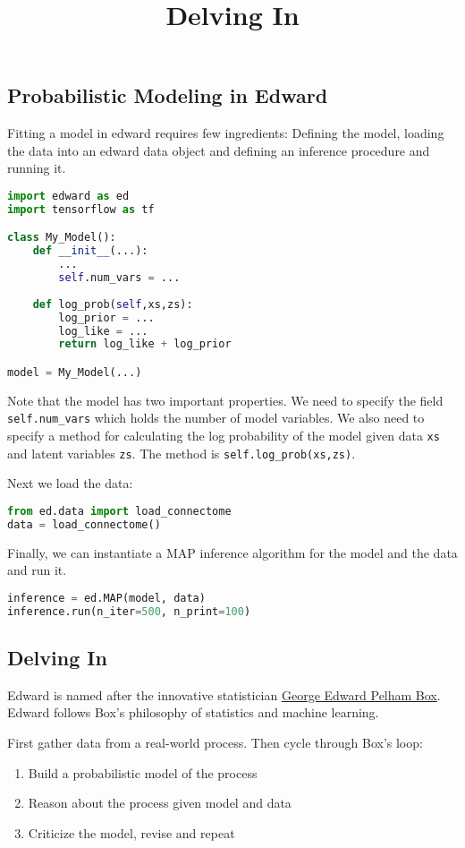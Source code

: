 \title{Delving In}

\subsection{Probabilistic Modeling in Edward}
Fitting a model in edward requires few ingredients: Defining the model, loading the data into an edward data object and defining an inference procedure and running it.

\begin{lstlisting}[language=Python]
import edward as ed
import tensorflow as tf

class My_Model():
    def __init__(...):
        ...
        self.num_vars = ...
 
    def log_prob(self,xs,zs):
        log_prior = ...
        log_like = ...
        return log_like + log_prior

model = My_Model(...)
\end{lstlisting}
Note that the model has two important properties. We need to specify the field \texttt{self.num\_vars} which holds the number of model variables. We also need to specify a method for calculating the log probability of the model given data \texttt{xs} and latent variables \texttt{zs}. The method is \texttt{self.log_prob(xs,zs)}.

Next we load the data:
\begin{lstlisting}[language=Python]
from ed.data import load_connectome
data = load_connectome()
\end{lstlisting}

Finally, we can instantiate a MAP inference algorithm for the model and the data and run it.
\begin{lstlisting}[language=Python]
inference = ed.MAP(model, data)
inference.run(n_iter=500, n_print=100)
\end{lstlisting}

\subsection{Delving In}
Edward is named after the innovative statistician
\href{https://en.wikipedia.org/wiki/George_E._P._Box}{George Edward
Pelham Box}. Edward follows Box's philosophy of statistics and machine
learning.

First gather data from a real-world process. Then cycle through Box's
loop:

\begin{enumerate}
\item Build a probabilistic model of the process
\item Reason about the process given model and data
\item Criticize the model, revise and repeat
\end{enumerate}

